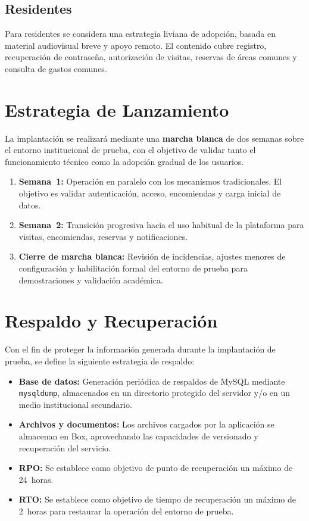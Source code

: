 \subsection{Residentes}

Para residentes se considera una estrategia liviana de adopción, basada en material audiovisual breve y apoyo remoto. El contenido cubre registro, recuperación de contraseña, autorización de visitas, reservas de áreas comunes y consulta de gastos comunes.

\section{Estrategia de Lanzamiento}

La implantación se realizará mediante una \textbf{marcha blanca} de dos semanas sobre el entorno institucional de prueba, con el objetivo de validar tanto el funcionamiento técnico como la adopción gradual de los usuarios.

\begin{enumerate}
    \item \textbf{Semana~1:} Operación en paralelo con los mecanismos tradicionales. El objetivo es validar autenticación, acceso, encomiendas y carga inicial de datos.

    \item \textbf{Semana~2:} Transición progresiva hacia el uso habitual de la plataforma para visitas, encomiendas, reservas y notificaciones.

    \item \textbf{Cierre de marcha blanca:} Revisión de incidencias, ajustes menores de configuración y habilitación formal del entorno de prueba para demostraciones y validación académica.
\end{enumerate}

\section{Respaldo y Recuperación}

Con el fin de proteger la información generada durante la implantación de prueba, se define la siguiente estrategia de respaldo:

\begin{itemize}
    \item \textbf{Base de datos:} Generación periódica de respaldos de MySQL mediante \texttt{mysqldump}, almacenados en un directorio protegido del servidor y/o en un medio institucional secundario.

    \item \textbf{Archivos y documentos:} Los archivos cargados por la aplicación se almacenan en Box, aprovechando las capacidades de versionado y recuperación del servicio.

    \item \textbf{RPO:} Se establece como objetivo de punto de recuperación un máximo de 24~horas.

    \item \textbf{RTO:} Se establece como objetivo de tiempo de recuperación un máximo de 2~horas para restaurar la operación del entorno de prueba.
\end{itemize}

